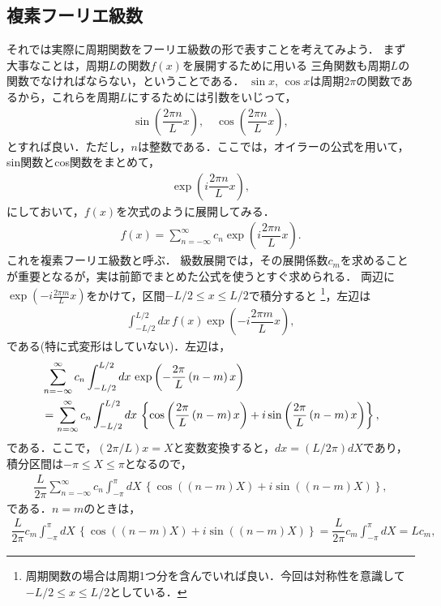 \subsection{複素フーリエ級数}
%
それでは実際に周期関数をフーリエ級数の形で表すことを考えてみよう．
まず大事なことは，周期$L$の関数$f\left(x\right)$を展開するために用いる
三角関数も周期$L$の関数でなければならない，ということである．
$\sin x$, $\cos x$は周期$2\pi$の関数であるから，これらを周期$L$にするためには引数をいじって，
\begin{align}
  \sin\left(\dfrac{2\pi n}{L}x\right),\quad \cos\left(\dfrac{2\pi n}{L}x\right),
\end{align}
とすれば良い．ただし，$n$は整数である．ここでは，オイラーの公式を用いて，sin関数とcos関数をまとめて，
\begin{align}
 \exp\left(i\dfrac{2\pi n}{L}x\right),
\end{align}
にしておいて，$f\left(x\right)$を次式のように展開してみる．
\begin{align}
 f\left(x\right) = \sum_{n=-\infty}^{\infty} c_{n} \exp\left(i\dfrac{2\pi n}{L}x\right). 
\end{align}
これを複素フーリエ級数と呼ぶ．
級数展開では，その展開係数$c_m$を求めることが重要となるが，実は前節でまとめた公式を使うとすぐ求められる．
両辺に$\exp(-i\frac{2\pi m}{L}x)$をかけて，区間$-L/2 \leq x \leq L/2$で積分すると
\footnote{周期関数の場合は周期1つ分を含んでいれば良い．今回は対称性を意識して$-L/2 \leq x \leq L/2$としている．}，左辺は
\begin{align}
\int_{-L/2}^{L/2}dx\,f\left(x\right)\exp\left(-i\dfrac{2\pi m}{L}x\right),
\end{align}
である(特に式変形はしていない)．左辺は，
\begin{align}
 &\sum_{n=-\infty}^{\infty}c_n\int_{-L/2}^{L/2}dx\,\exp\left(-\dfrac{2\pi}{L}\left(n-m\right)x\right) \notag \\
 &=\sum_{n=\infty}^{\infty}c_n\int_{-L/2}^{L/2}dx\,\left\{\cos\left(\dfrac{2\pi}{L}\left(n-m\right)x\right) 
   + i\sin\left(\dfrac{2\pi}{L}\left(n-m\right)x\right)\right\},
\end{align}
である．ここで，$(2\pi/L)x = X$と変数変換すると，$dx = (L/2\pi)dX$であり，
積分区間は$-\pi\leq X \leq \pi$となるので，
\begin{align}
  \dfrac{L}{2\pi}  \sum_{n=-\infty}^{\infty} c_n \int_{-\pi}^{\pi}dX\, \left\{\cos\left(\left(n-m\right)X\right) + i\sin\left(\left(n-m\right)X\right)\right\},
\end{align}
である．$n=m$のときは，
\begin{align}
 \dfrac{L}{2\pi}  c_m \int_{-\pi}^{\pi}dX\, \left\{\cos\left(\left(n-m\right)X\right) + i\sin\left(\left(n-m\right)X\right)\right\} = \dfrac{L}{2\pi}c_{m}\int_{-\pi}^{\pi}dX = Lc_{m},
\end{align}
